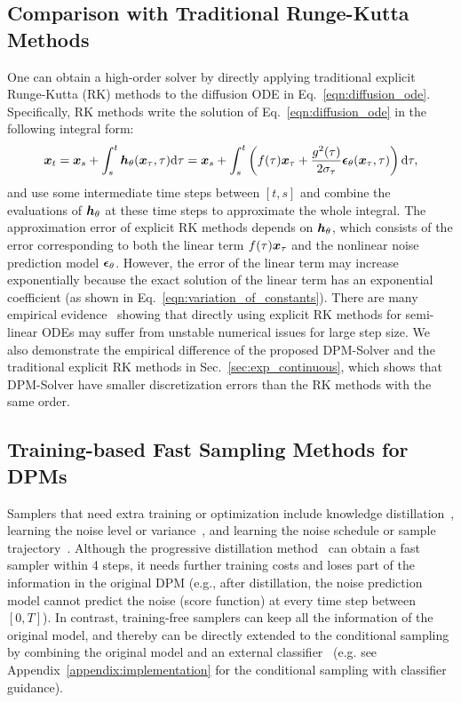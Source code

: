 \subsection{Comparison with Traditional Runge-Kutta Methods}


One can obtain a high-order solver by directly applying traditional explicit Runge-Kutta (RK) methods to the diffusion ODE in Eq.~\eqref{eqn:diffusion_ode}.
Specifically, RK methods write the solution of Eq.~\eqref{eqn:diffusion_ode} in the following integral form:
\begin{equation}
    \bm{x}_t = \bm{x}_s + \int_s^t \bm{h}_\theta(\bm{x}_\tau,\tau)\dd\tau = \bm{x}_s + \int_s^t \left( f(\tau)\bm{x}_{\tau} + \frac{g^2(\tau)}{2\sigma_{\tau}}\bm{\epsilon}_\theta(\bm{x}_{\tau},\tau) \right) \dd\tau,
\end{equation}
and use some intermediate time steps between $[t, s]$ and combine the evaluations of $\bm{h}_\theta$ at these time steps to approximate the whole integral. 
The approximation error of explicit RK methods depends on $\bm{h}_\theta$, which consists of the error corresponding to both the linear term $f(\tau)\bm{x}_\tau$ and the nonlinear noise prediction model $\bm{\epsilon}_\theta$. However, the error of the linear term may increase exponentially because the exact solution of the linear term has an exponential coefficient (as shown in Eq.~\eqref{eqn:variation_of_constants}). There are many empirical evidence~\citep{hochbruck2010exponential,hochbruck2005explicit} showing that directly using explicit RK methods for semi-linear ODEs may suffer from unstable numerical issues for large step size. We also demonstrate the empirical difference of the proposed DPM-Solver and the traditional explicit RK methods in Sec.~\ref{sec:exp_continuous}, which shows that DPM-Solver have smaller discretization errors than the RK methods with the same order.









\subsection{Training-based Fast Sampling Methods for DPMs}
Samplers that need extra training or optimization include knowledge distillation~\citep{salimans2022progressive,luhman2021knowledge}, learning the noise level or variance~\citep{san2021noise,nichol2021improved,bao2022estimating}, and learning the noise schedule or sample trajectory~\citep{lam2021bilateral,watson2021learning}. Although the progressive distillation method~\citep{salimans2022progressive} can obtain a fast sampler within 4 steps, it needs further training costs and loses part of the information in the original DPM (e.g., after distillation, the noise prediction model cannot predict the noise (score function) at every time step between $[0,T]$). In contrast, training-free samplers can keep all the information of the original model, and thereby can be directly extended to the conditional sampling by combining the original model and an external classifier~\citep{dhariwal2021diffusion} (e.g. see Appendix~\ref{appendix:implementation} for the conditional sampling with classifier guidance).

